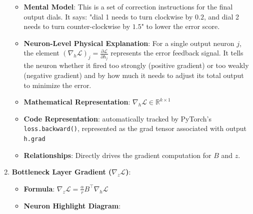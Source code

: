 \begin{enumerate}
\begin{itemize}
      \item \textbf{Mental Model}: This is a set of correction instructions for the final output dials. It says: "dial 1 needs to turn clockwise by $0.2$, and dial 2 needs to turn counter-clockwise by $1.5$" to lower the error score.
      \item \textbf{Neuron-Level Physical Explanation}: For a single output neuron $j$, the element $(\nabla_h \mathcal{L})_j = \frac{\partial \mathcal{L}}{\partial h_j}$ represents the error feedback signal. It tells the neuron whether it fired too strongly (positive gradient) or too weakly (negative gradient) and by how much it needs to adjust its total output to minimize the error.
      \item \textbf{Mathematical Representation}: $\nabla_h \mathcal{L} \in \mathbb{R}^{k \times 1}$
      \item \textbf{Code Representation}: automatically tracked by PyTorch's \texttt{loss.backward()}, represented as the grad tensor associated with output \texttt{h.grad}
      \item \textbf{Relationships}: Directly drives the gradient computation for $B$ and $z$.
    \end{itemize}

  \item \textbf{Bottleneck Layer Gradient ($\nabla_z \mathcal{L}$)}:
    \begin{itemize}
      \item \textbf{Formula}: $\nabla_z \mathcal{L} = \frac{\alpha}{r} B^\top \nabla_h \mathcal{L}$
      \item \textbf{Neuron Highlight Diagram}:

\begin{center}
\begin{adjustbox}{max width=0.85\linewidth}
\end{adjustbox}
\end{center}
\end{itemize}
\end{enumerate}
